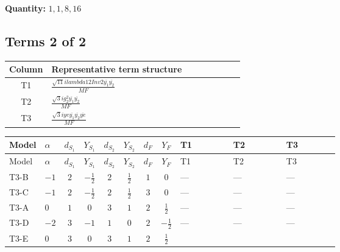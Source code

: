 \documentclass[8pt]{article}
\begin{document}
\begin{landscape}
\begin{longtable}{@{}llcccccc >{\raggedright\arraybackslash}p{0.21\linewidth} >{\raggedright\arraybackslash}p{0.21\linewidth} >{\raggedright\arraybackslash}p{0.21\linewidth}@{}}
\midrule
\bottomrule
\end{longtable}
\clearpage
\noindent\textbf{Quantity: }$\mathrm{1,1,8,16}$\par\smallskip
\subsection*{Terms 2 of 2}
\begin{center}
\begin{tabular}{@{}c >{\raggedright\arraybackslash}p{0.82\linewidth}@{}}
\toprule
Column & Representative term structure \\
\midrule
T1 & \(\displaystyle \frac{\sqrt{11} i lambda12Inv2 \overline{y_{1}} \overline{y_{2}}}{MF}\) \\
\midrule
T2 & \(\displaystyle \frac{\sqrt{3} i g_{2}^{2} \overline{y_{1}} \overline{y_{2}}}{MF}\) \\
\midrule
T3 & \(\displaystyle \frac{\sqrt{3} i ye \overline{y_{1}} \overline{y_{2}} \overline{ye}}{MF}\) \\
\midrule
\bottomrule
\end{tabular}
\end{center}
\smallskip
\tiny
\begin{longtable}{@{}llcccccc >{\raggedright\arraybackslash}p{0.21\linewidth} >{\raggedright\arraybackslash}p{0.21\linewidth} >{\raggedright\arraybackslash}p{0.21\linewidth}@{}}
\toprule
Model & $\alpha$ & $d_{S_1}$ & $Y_{S_1}$ & $d_{S_2}$ & $Y_{S_2}$ & $d_F$ & $Y_F$ & T1 & T2 & T3 \\
\midrule
\endfirsthead
\toprule
Model & $\alpha$ & $d_{S_1}$ & $Y_{S_1}$ & $d_{S_2}$ & $Y_{S_2}$ & $d_F$ & $Y_F$ & T1 & T2 & T3 \\
\midrule
\endhead
T3-B & $-1$ & $2$ & $-\frac{1}{2}$ & $2$ & $\frac{1}{2}$ & $1$ & $0$ & --- & --- & --- \\
\midrule
T3-C & $-1$ & $2$ & $-\frac{1}{2}$ & $2$ & $\frac{1}{2}$ & $3$ & $0$ & --- & --- & --- \\
\midrule
T3-A & $0$ & $1$ & $0$ & $3$ & $1$ & $2$ & $\frac{1}{2}$ & --- & --- & --- \\
\midrule
T3-D & $-2$ & $3$ & $-1$ & $1$ & $0$ & $2$ & $-\frac{1}{2}$ & --- & --- & --- \\
\midrule
T3-E & $0$ & $3$ & $0$ & $3$ & $1$ & $2$ & $\frac{1}{2}$ & \scriptsize\adjustbox{max width=\linewidth}{$\begin{gathered} \frac{3 \sqrt{11} i lambda12Inv2 \overline{y_{1}} \overline{y_{2}}}{22 MF}\end{gathered}$} & \scriptsize\adjustbox{max width=\linewidth}{$\begin{gathered} \frac{11 \sqrt{3} i g_{2}^{2} \overline{y_{1}} \overline{y_{2}}}{8 MF}\end{gathered}$} & \scriptsize\adjustbox{max width=\linewidth}{$\begin{gathered} - \frac{\sqrt{3} i ye \overline{y_{1}} \overline{y_{2}} \overline{ye}}{12 MF}\end{gathered}$} \\

\end{longtable}
\end{landscape}
\end{document}
